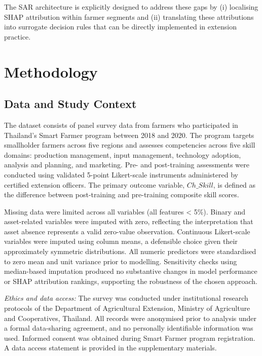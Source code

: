 \documentclass[3p,twocolumn,authoryear]{elsarticle}
\begin{document}
The SAR architecture is explicitly designed to address these gaps by
(i) localising SHAP attribution within farmer segments and
(ii) translating these attributions into surrogate decision rules that
can be directly implemented in extension practice.

\section{Methodology}

\subsection{Data and Study Context}

The dataset consists of panel survey data from farmers who participated
in Thailand’s Smart Farmer program between 2018 and 2020.
The program targets smallholder farmers across five regions and assesses
competencies across five skill domains: production management, input
management, technology adoption, analysis and planning, and marketing.
Pre- and post-training assessments were conducted using validated
5-point Likert-scale instruments administered by certified extension
officers.
The primary outcome variable, $Ch\_Skill$, is defined as the difference
between post-training and pre-training composite skill scores.

Missing data were limited across all variables (all features < 5\%).
Binary and asset-related variables were imputed with zero, reflecting the
interpretation that asset absence represents a valid zero-value
observation.
Continuous Likert-scale variables were imputed using column means, a
defensible choice given their approximately symmetric distributions.
All numeric predictors were standardised to zero mean and unit variance
prior to modelling.
Sensitivity checks using median-based imputation produced no substantive
changes in model performance or SHAP attribution rankings, supporting the
robustness of the chosen approach.

\textit{Ethics and data access:}
The survey was conducted under institutional research protocols of the
Department of Agricultural Extension, Ministry of Agriculture and
Cooperatives, Thailand.
All records were anonymised prior to analysis under a formal data-sharing
agreement, and no personally identifiable information was used.
Informed consent was obtained during Smart Farmer program registration.
A data access statement is provided in the supplementary materials.
\end{document}
